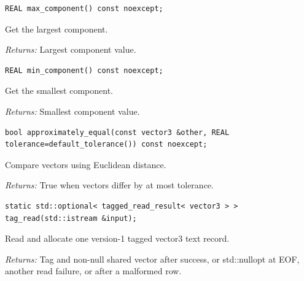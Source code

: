 \par\noindent\begin{minipage}{\linewidth}
\begin{lstlisting}[style=apireference]
REAL max_component() const noexcept;
\end{lstlisting}
{\footnotesize Get the largest component.\par}
{\footnotesize\textit{Returns:} Largest component value.\par}
\end{minipage}\par\vspace{1pt}
\par\noindent\begin{minipage}{\linewidth}
\begin{lstlisting}[style=apireference]
REAL min_component() const noexcept;
\end{lstlisting}
{\footnotesize Get the smallest component.\par}
{\footnotesize\textit{Returns:} Smallest component value.\par}
\end{minipage}\par\vspace{1pt}
\par\noindent\begin{minipage}{\linewidth}
\begin{lstlisting}[style=apireference]
bool approximately_equal(const vector3 &other, REAL tolerance=default_tolerance()) const noexcept;
\end{lstlisting}
{\footnotesize Compare vectors using Euclidean distance.\par}
{\footnotesize\textit{Returns:} True when vectors differ by at most tolerance.\par}
\end{minipage}\par\vspace{1pt}
\par\noindent\begin{minipage}{\linewidth}
\begin{lstlisting}[style=apireference]
static std::optional< tagged_read_result< vector3 > > tag_read(std::istream &input);
\end{lstlisting}
{\footnotesize Read and allocate one version-1 tagged vector3 text record.\par}
{\footnotesize\textit{Returns:} Tag and non-null shared vector after success, or std::nullopt at EOF, another read failure, or after a malformed row.\par}
\end{minipage}\par\vspace{1pt}
